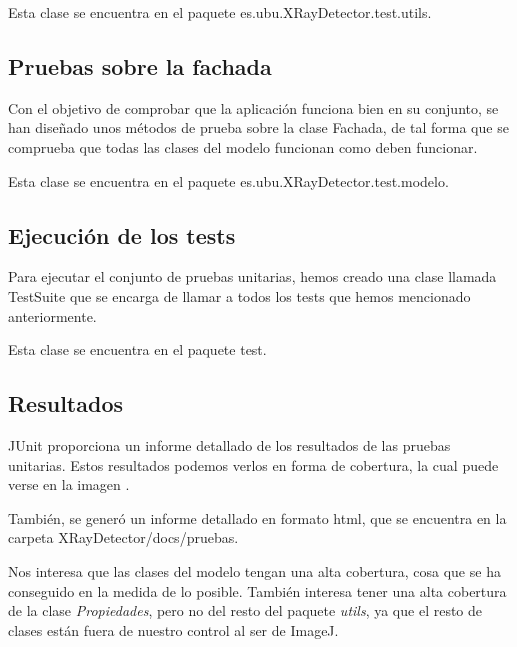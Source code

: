 Esta clase se encuentra en el paquete es.ubu.XRayDetector.test.utils.

\subsection{Pruebas sobre la fachada}
Con el objetivo de comprobar que la aplicación funciona bien en su conjunto, se han diseñado unos métodos de prueba sobre la clase Fachada, de tal forma que se comprueba que todas las clases del modelo funcionan como deben funcionar.

Esta clase se encuentra en el paquete es.ubu.XRayDetector.test.modelo.

\subsection{Ejecución de los tests}
Para ejecutar el conjunto de pruebas unitarias, hemos creado una clase llamada TestSuite que se encarga de llamar a todos los tests que hemos mencionado anteriormente.

Esta clase se encuentra en el paquete test.

\subsection{Resultados}
JUnit proporciona un informe detallado de los resultados de las pruebas unitarias. Estos resultados podemos verlos en forma de cobertura, la cual puede verse en la imagen .


También, se generó un informe detallado en formato html, que se encuentra en la carpeta XRayDetector/docs/pruebas.

Nos interesa que las clases del modelo tengan una alta cobertura, cosa que se ha conseguido en la medida de lo posible. También interesa tener una alta cobertura de la clase \textit{Propiedades}, pero no del resto del paquete \textit{utils}, ya que el resto de clases están fuera de nuestro control al ser de ImageJ.

 
